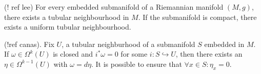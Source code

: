 \begin{theorem} \label{extub}
(! ref lee)
For every embedded submanifold of a Riemannian manifold $(M,g)$, there exists a tubular neighbourhood in $M$. If the submanifold is compact, there exists a uniform tubular neighbourhood.
\end{theorem}

\begin{proposition} \label{homoform} (!ref canas).
Fix $U$, a tubular neighburhood of a submanifold $S$ embedded in $M$. If $\omega \in \Omega^k(U)$ is closed and $i^* \omega = 0$ for some $i : S \hookrightarrow U$, then there exists an $\eta \in \Omega^{k-1}(U)$ with $\omega = d\eta$. It is possible to ensure that $\forall x \in S: \eta_x = 0$.
\end{proposition}

